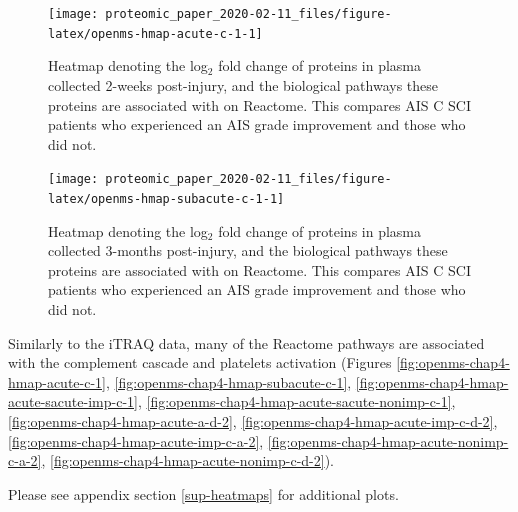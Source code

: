 \documentclass[9pt,lineno]{elife}
\newcommand{\blandscape}{\begin{landscape}}
\newcommand{\elandscape}{\end{landscape}}
\begin{document}
\clearpage
\blandscape



\begin{figure}

{\centering \texttt{[image: proteomic\_paper\_2020-02-11\_files/figure-latex/openms-hmap-acute-c-1-1]} 

}

\caption{Heatmap denoting the log\(_2\) fold change of proteins in plasma collected 2-weeks post-injury, and the biological pathways these proteins are associated with on Reactome. This compares AIS C SCI patients who experienced an AIS grade improvement and those who did not.}\label{fig:openms-hmap-acute-c-1}
\end{figure}

\elandscape
\blandscape



\begin{figure}

{\centering \texttt{[image: proteomic\_paper\_2020-02-11\_files/figure-latex/openms-hmap-subacute-c-1-1]} 

}

\caption{Heatmap denoting the log\(_2\) fold change of proteins in plasma collected 3-months post-injury, and the biological pathways these proteins are associated with on Reactome. This compares AIS C SCI patients who experienced an AIS grade improvement and those who did not.}\label{fig:openms-hmap-subacute-c-1}
\end{figure}

\elandscape
\clearpage

Similarly to the iTRAQ data, many of the Reactome pathways are associated with the complement cascade and platelets activation (Figures \ref{fig:openms-chap4-hmap-acute-c-1}, \ref{fig:openms-chap4-hmap-subacute-c-1}, \ref{fig:openms-chap4-hmap-acute-sacute-imp-c-1}, \ref{fig:openms-chap4-hmap-acute-sacute-nonimp-c-1}, \ref{fig:openms-chap4-hmap-acute-a-d-2}, \ref{fig:openms-chap4-hmap-acute-imp-c-d-2}, \ref{fig:openms-chap4-hmap-acute-imp-c-a-2}, \ref{fig:openms-chap4-hmap-acute-nonimp-c-a-2}, \ref{fig:openms-chap4-hmap-acute-nonimp-c-d-2}).

Please see appendix section \ref{sup-heatmaps} for additional plots.
\end{document}
